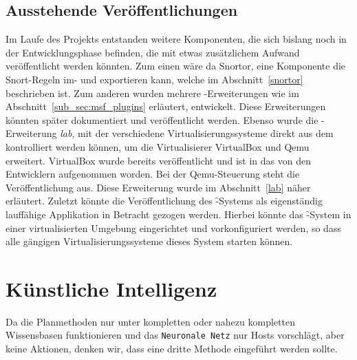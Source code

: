 \subsection{Ausstehende Veröffentlichungen}

Im Laufe des Projekts entstanden weitere Komponenten, die sich bislang
noch in der Entwicklungsphase befinden, die mit etwas zusätzlichem
Aufwand veröffentlicht werden könnten. Zum einen wäre da Snortor, eine
Komponente die Snort-Regeln im- und exportieren kann, welche im
Abschnitt~\ref{snortor} beschrieben ist. Zum anderen wurden mehrere
-Erweiterungen wie im Abschnitt~\ref{sub_sec:msf_plugins}
erläutert, entwickelt. Diese Erweiterungen könnten später dokumentiert
und veröffentlicht werden. Ebenso wurde die -Erweiterung
\textit{lab}, mit der verschiedene Virtualisierungssysteme direkt aus
dem  kontrolliert werden können, um die Virtualisierer
VirtualBox und Qemu erweitert. VirtualBox wurde bereits veröffentlicht
und ist in das  von den Entwicklern aufgenommen worden. Bei
der Qemu-Steuerung steht die Veröffentlichung aus. Diese Erweiterung
wurde im Abschnitt~\ref{lab} näher erläutert.  Zuletzt könnte die
Veröffentlichung des \f-Systems als eigenständig lauffähige
Applikation in Betracht gezogen werden. Hierbei könnte das \f-System
in einer virtualisierten Umgebung eingerichtet und vorkonfiguriert
werden, so dass alle gängigen Virtualisierungssysteme dieses System
starten können.


\section{Künstliche Intelligenz}
\authors{\DK}{\DE \and \HM}
Da die Planmethoden nur unter kompletten oder nahezu kompletten
Wissensbasen funktionieren und das \verb#Neuronale Netz# nur Hosts
vorschlägt, aber keine Aktionen, denken wir, dass eine dritte Methode
eingeführt werden sollte.

